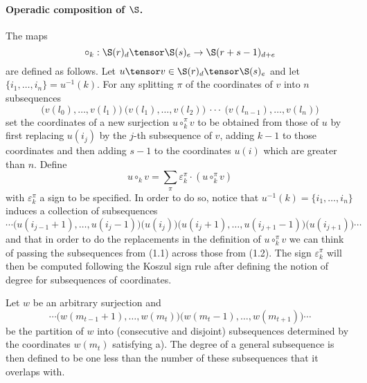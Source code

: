 \documentclass[main.tex]{subfiles}
\begin{document}
\paragraph{Operadic composition of $\S$.} The maps $$\circ_k:\S(r)_d\tensor\S(s)_e\to\S(r+s-1)_{d+e}$$ are defined as follows. Let $u\tensor v\in\S(r)_d\tensor \S(s)_e$ and let $\{i_1,\dotsc,i_n\}=u^{-1}(k)$. For any splitting $\pi$ of the coordinates of $v$ into $n$ subsequences
\begin{equation}
\big(v(l_0),\dotsc,v(l_1)\big) \ \big(v(l_1),\dotsc,v(l_2)\big) \ \cdot\cdot\cdot \ \big(v(l_{n-1}),\dotsc,v(l_n)\big)
\end{equation}
set the coordinates of a new surjection $u\circ_k^{\pi}v$ to be obtained from those of $u$ by first replacing $u(i_j)$ by the $j$-th subsequence of $v$, adding $k-1$ to those coordinates and then adding $s-1$ to the coordinates $u(i)$ which are greater than $n$. Define $$u\circ_k v=\sum_{\pi}\varepsilon_k^\pi\cdot(u\circ_k^{\pi}v)$$ with $\varepsilon_k^\pi$ a sign to be specified. In order to do so, notice that $u^{-1}(k)=\{i_1,\dotsc,i_n\}$ induces a collection of subsequences
\begin{equation}
\cdots\big(u(i_{j-1}+1),\dotsc,u(i_{j}-1)\big)\big(u(i_j)\big)\big(u(i_j+1),\dotsc,u(i_{j+1}-1)\big)\big(u(i_{j+1})\big)\cdots
\end{equation} and that in order to do the replacements in the definition of $u\circ_k^{\pi}v$ we can think of passing the subsequences from (1.1) across those from (1.2). The sign $\varepsilon_k^\pi$ will then be computed following the Koszul sign rule after defining the notion of degree for subsequences of coordinates.

Let $w$ be an arbitrary surjection and $$\cdots\big(w(m_{t-1}+1),\dotsc,w(m_t)\big)\big(w(m_t-1),\dotsc,w(m_{t+1})\big)\cdots$$ be the partition of $w$ into (consecutive and disjoint) subsequences determined by the coordinates $w(m_t)$ satisfying a). The degree of a general subsequence is then defined to be one less than the number of these subsequences that it overlaps with.
\end{document}
